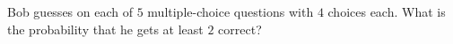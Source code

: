 Bob guesses on each of $5$ multiple-choice questions with $4$ choices each. What is the probability that he gets at least $2$ correct?
